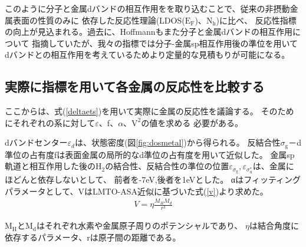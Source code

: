 \documentclass[12pt]{ltjsarticle}
\begin{document}
このように分子と金属dバンドの相互作用をを取り込むことで、従来の非摂動金属表面の性質のみに
依存した反応性理論(LDOS($\text{E}_\text{F}$)、$\text{N}_\text{h}$)に比べ、
反応性指標の向上が見込まれる。過去に、Hoffmannもまた分子と金属dバンドの相互作用について
指摘していた\cite{Hoffman1988}が、我々の指標では分子-金属sp相互作用後の準位を用いて
dバンドとの相互作用を考えているためより定量的な見積もりが可能になる。

\subsection{実際に指標を用いて各金属の反応性を比較する}
ここからは、式(\ref{deltaets})を用いて実際に金属の反応性を議論する。
そのためにそれぞれの系に対して$\varepsilon$、f、$\alpha$、$\text{V}^\text{2}$の値を求める
必要がある。

dバンドセンター$\varepsilon_d$は、状態密度(図\ref{fig:dosmetal})から得られる。
反結合性$\sigma_\text{g}$－d準位の占有度fは表面金属の局所的なd準位の占有度を用いて近似した。
金属sp軌道と相互作用した後の$\text{H}_\text{2}$の結合性、反結合性の準位の位置$\varepsilon _
{\sigma_\text{g}},\varepsilon _{\sigma_\text{u}^*}$は、金属にほどんと依存しないとして、
前者を-7eV,後者を1eVとした。
αはフィッティングパラメータとして、VはLMTO-ASA近似に基づいた式(\ref{v})より求めた。
\cite{Norskov1989}
\begin{eqnarray}
    \label{v}
    V = \eta \frac{ M_H M_d }{r^3}
\end{eqnarray}

$\text{M}_\text{H}$と$\text{M}_\text{d}$はそれぞれ水素や金属原子周りのポテンシャルであり、
$\eta$は結合角度に依存するパラメータ、rは原子間の距離である。
\end{document}

